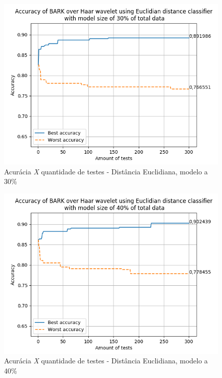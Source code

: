 \begin{myenv}{1.5}
		\newpage
		\begin{figure}[h]
			\centering
			\includegraphics{images/results/confusionMatrices/classifier_Euclidian_30}
			\caption{Acurácia \textit{X} quantidade de testes - Distância Euclidiana, modelo a 30\%}
			\label{fig:classifiereuclidian30}
		\end{figure}
		

		\newpage	
		\begin{figure}[h]
			\centering
			\includegraphics{images/results/confusionMatrices/classifier_Euclidian_40}
			\caption{Acurácia \textit{X} quantidade de testes - Distância Euclidiana, modelo a 40\%}
			\label{fig:classifiereuclidian40}
		\end{figure}
		
	

\end{myenv}
